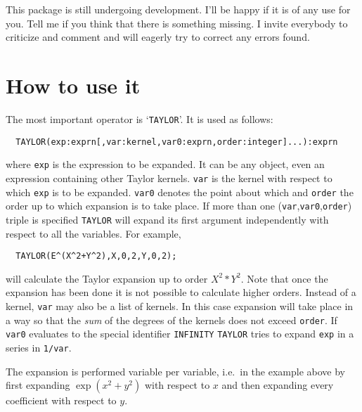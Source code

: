 This package is still undergoing development.
I'll be happy if it is of any use for you.
Tell me if you think that there is something missing.
I invite everybody to criticize and comment and will eagerly try to 
correct any errors found.

\section{How to use it}

The most important operator is `\verb+TAYLOR+'.
It is used as follows:
\begin{verbatim}
  TAYLOR(exp:exprn[,var:kernel,var0:exprn,order:integer]...):exprn
\end{verbatim}
where \verb|exp| is the expression to be expanded. It can be any
\REDUCE{} object, even an expression containing other Taylor kernels.
\verb|var| is the kernel with respect to
which \verb|exp| is to be expanded. \verb|var0| denotes the point
about
which and \verb|order| the order up to which expansion is to take
place.
If more than one (\verb|var|,\verb|var0|,\verb|order|) triple is
specified \verb|TAYLOR| will expand its first argument independently
with respect to all the variables.
For example,
\begin{verbatim}
  TAYLOR(E^(X^2+Y^2),X,0,2,Y,0,2);
\end{verbatim}
will calculate the Taylor expansion up to order $X^{2}*Y^{2}$.
Note that once the expansion has been done it is not possible to 
calculate higher orders.
Instead of a kernel, \verb|var| may also
be a list of kernels. In this case expansion will take place in a way
so that the {\em sum\/} of the degrees of the kernels does not exceed
\verb|order|.
If \verb|var0| evaluates to the special identifier \verb|INFINITY|
\verb|TAYLOR| tries to expand \verb|exp| in a series in \verb|1/var|.

The expansion is performed variable per variable, i.e.\ in the example
above by first expanding $\exp(x^{2}+y^{2})$ with respect to $x$ and
then expanding every coefficient with respect to $y$.

